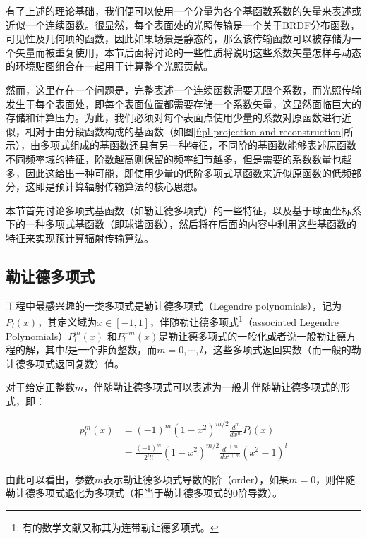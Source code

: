有了上述的理论基础，我们便可以使用一个分量为各个基函数系数的矢量来表述或近似一个连续函数。很显然，每个表面处的光照传输是一个关于BRDF分布函数，可见性及几何项的函数，因此如果场景是静态的，那么该传输函数可以被存储为一个矢量而被重复使用，本节后面将讨论的一些性质将说明这些系数矢量怎样与动态的环境贴图组合在一起用于计算整个光照贡献。

然而，这里存在一个问题是，完整表述一个连续函数需要无限个系数，而光照传输发生于每个表面处，即每个表面位置都需要存储一个系数矢量，这显然面临巨大的存储和计算压力。为此，我们必须对每个表面点使用少量的系数对原函数进行近似，相对于由分段函数构成的基函数（如图\ref{f:pl-projection-and-reconstruction}所示），由多项式组成的基函数还具有另一种特征，不同阶的基函数能够表述原函数不同频率域的特征，阶数越高则保留的频率细节越多，但是需要的系数数量也越多，因此这给出一种可能，即使用少量的低阶多项式基函数来近似原函数的低频部分，这即是预计算辐射传输算法的核心思想。

本节首先讨论多项式基函数（如勒让德多项式）的一些特征，以及基于球面坐标系下的一种多项式基函数（即球谐函数），然后将在后面的内容中利用这些基函数的特征来实现预计算辐射传输算法。




\subsection{勒让德多项式}
工程中最感兴趣的一类多项式是勒让德多项式（Legendre polynomials），记为$P_l(x)$，其定义域为$x\in[-1,1]$，伴随勒让德多项式\footnote{有的数学文献又称其为连带勒让德多项式。}（associated Legendre Polynomials）$P^{m}_{l}(x)$ 和$P^{-m}_{l}(x)$是勒让德多项式的一般化或者说一般勒让德方程的解，其中$l$是一个非负整数，而$m=0,\cdots,l$，这些多项式返回实数（而一般的勒让德多项式返回复数）值。

对于给定正整数$m$，伴随勒让德多项式可以表述为一般非伴随勒让德多项式的形式，即：

\begin{equation}
\begin{aligned}
	p^{m}_{l}(x)&=(-1)^{m}(1-x^{2})^{m/2}\frac{d^{m}}{dx^{m}}P_l(x)\\
	&=\frac{(-1)^{m}}{2^{l}l!}(1-x^{2})^{m/2}\frac{d^{l+m}}{dx^{l+m}}(x^{2}-1)^{l}
\end{aligned}
\end{equation}

由此可以看出，参数$m$表示勒让德多项式导数的阶（order），如果$m=0$，则伴随勒让德多项式退化为多项式（相当于勒让德多项式的0阶导数）。

